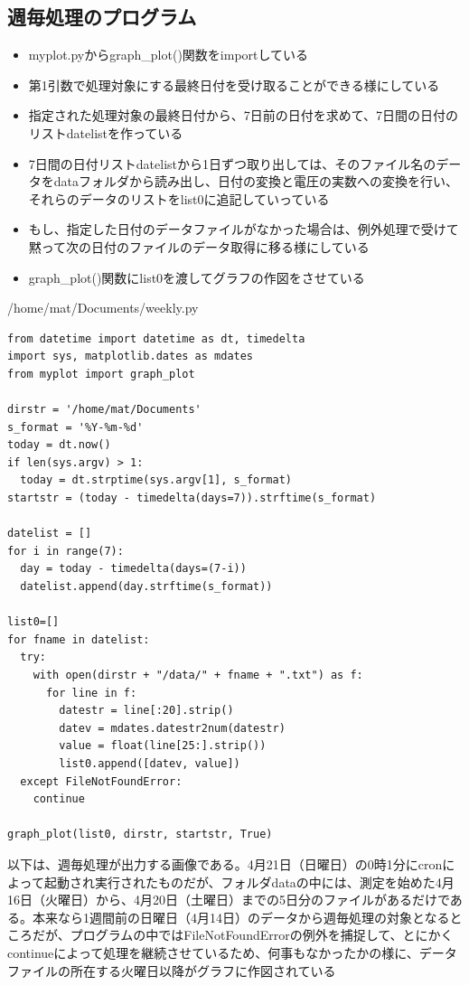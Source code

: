 \documentclass[12pt,a4paper,uplatex]{jsarticle}
\begin{document}
\subsection{週毎処理のプログラム}

\begin{itemize}
	\item myplot.pyからgraph\_plot()関数をimportしている
	\item 第1引数で処理対象にする最終日付を受け取ることができる様にしている
	\item 指定された処理対象の最終日付から、7日前の日付を求めて、7日間の日付のリストdatelistを作っている
	\item 7日間の日付リストdatelistから1日ずつ取り出しては、そのファイル名のデータをdataフォルダから読み出し、日付の変換と電圧の実数への変換を行い、それらのデータのリストをlist0に追記していっている
	\item もし、指定した日付のデータファイルがなかった場合は、例外処理で受けて黙って次の日付のファイルのデータ取得に移る様にしている
	\item graph\_plot()関数にlist0を渡してグラフの作図をさせている
\end{itemize}

\begin{itembox}[l]{/home/mat/Documents/weekly.py}
	\begin{verbatim}
from datetime import datetime as dt, timedelta
import sys, matplotlib.dates as mdates
from myplot import graph_plot

dirstr = '/home/mat/Documents'
s_format = '%Y-%m-%d'
today = dt.now()
if len(sys.argv) > 1:
  today = dt.strptime(sys.argv[1], s_format)
startstr = (today - timedelta(days=7)).strftime(s_format)

datelist = []
for i in range(7):
  day = today - timedelta(days=(7-i))
  datelist.append(day.strftime(s_format))

list0=[]
for fname in datelist:
  try:
    with open(dirstr + "/data/" + fname + ".txt") as f:
      for line in f:
        datestr = line[:20].strip()
        datev = mdates.datestr2num(datestr)
        value = float(line[25:].strip())
        list0.append([datev, value])
  except FileNotFoundError:
    continue

graph_plot(list0, dirstr, startstr, True)
	\end{verbatim}
\end{itembox}

\newpage

以下は、週毎処理が出力する画像である。4月21日（日曜日）の0時1分にcronによって起動され実行されたものだが、フォルダdataの中には、測定を始めた4月16日（火曜日）から、4月20日（土曜日）までの5日分のファイルがあるだけである。本来なら1週間前の日曜日（4月14日）のデータから週毎処理の対象となるところだが、プログラムの中ではFileNotFoundErrorの例外を捕捉して、とにかくcontinueによって処理を継続させているため、何事もなかったかの様に、データファイルの所在する火曜日以降がグラフに作図されている
\end{document}
